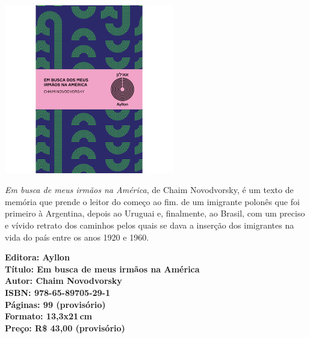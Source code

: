 \begin{center}
\hspace*{-3.6cm}
\hspace*{3.1cm}\includegraphics[width=74mm]{./CAPAS/AYLLON_AMERICA.jpg}
\end{center}
\hspace*{-7cm}\hrulefill\hspace*{-7cm}
\medskip

\noindent{}\textit{Em busca de meus irmãos na América}, de Chaim Novodvorsky, é um texto de memória que prende o leitor do começo ao fim.  de um imigrante polonês que foi primeiro à Argentina, depois ao Uruguai e, finalmente, ao Brasil, com um preciso e vívido retrato dos caminhos pelos quais se dava a inserção dos imigrantes na vida do país entre os anos 1920 e 1960. 

\vfill
\noindent\begin{minipage}[c]{1\linewidth}
{\small\textbf{
\hspace*{-.1cm}Editora: Ayllon\\
Título: Em busca de meus irmãos na América\\
Autor: Chaim Novodvorsky\\ 
ISBN: 978-65-89705-29-1\\
Páginas: 99 (provisório)\\
Formato: 13,3x21\,cm\\
Preço: R\$ 43,00 (provisório)\\
}}
\end{minipage}
\pagebreak

\vspace*{1.5cm}
\bigskip

